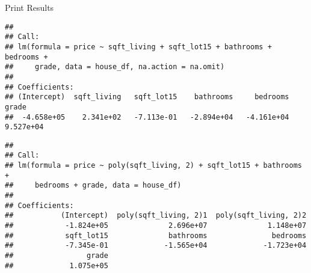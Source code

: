 \documentclass[
  ignorenonframetext,
]{beamer}
\begin{document}
\begin{frame}[fragile]{Print Results}
\label{print-results-1}
\begin{verbatim}
## 
## Call:
## lm(formula = price ~ sqft_living + sqft_lot15 + bathrooms + bedrooms + 
##     grade, data = house_df, na.action = na.omit)
## 
## Coefficients:
## (Intercept)  sqft_living   sqft_lot15    bathrooms     bedrooms        grade  
##  -4.658e+05    2.341e+02   -7.113e-01   -2.894e+04   -4.161e+04    9.527e+04
\end{verbatim}

\begin{verbatim}
## 
## Call:
## lm(formula = price ~ poly(sqft_living, 2) + sqft_lot15 + bathrooms + 
##     bedrooms + grade, data = house_df)
## 
## Coefficients:
##           (Intercept)  poly(sqft_living, 2)1  poly(sqft_living, 2)2  
##            -1.824e+05              2.696e+07              1.148e+07  
##            sqft_lot15              bathrooms               bedrooms  
##            -7.345e-01             -1.565e+04             -1.723e+04  
##                 grade  
##             1.075e+05
\end{verbatim}
\end{frame}
\end{document}
